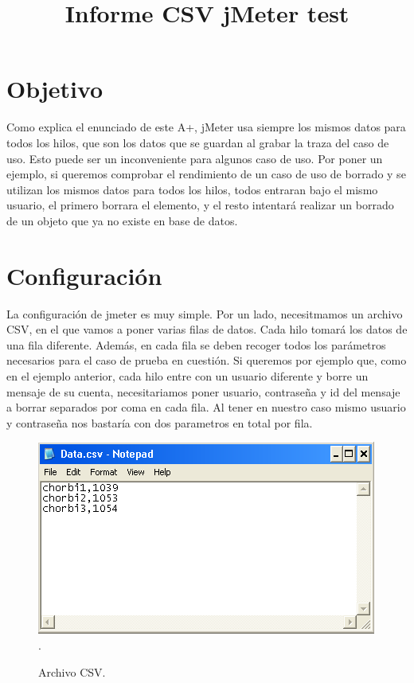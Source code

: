 \documentclass[a4paper]{article}
\title{Informe CSV jMeter test}
\date{}
\begin{document}
\setlength{\voffset}{-1in}
\setlength{\textheight}{680px}
\setlength{\headsep}{30px}
\maketitle

\section{Objetivo}

Como explica el enunciado de este A+, jMeter usa siempre los mismos datos para todos los hilos, que son los datos que se guardan al grabar la traza del caso de uso. Esto puede ser un inconveniente para algunos caso de uso. Por poner un ejemplo, si queremos comprobar el rendimiento de un caso de uso de borrado y se utilizan los mismos datos para todos los hilos, todos entraran bajo el mismo usuario, el primero borrara el elemento, y el resto intentará realizar un borrado de un objeto que ya no existe en base de datos.

\section{Configuración}

La configuración de jmeter es muy simple. Por un lado, necesitmamos un archivo CSV, en el que vamos a poner varias filas de datos. Cada hilo tomará los datos de una fila diferente. Además, en cada fila se deben recoger todos los parámetros necesarios para el caso de prueba en cuestión. Si queremos por ejemplo que, como en el ejemplo anterior, cada hilo entre con un usuario diferente y borre un mensaje de su cuenta, necesitariamos poner usuario, contraseña y id del mensaje a borrar separados por coma en cada fila. Al tener en nuestro caso mismo usuario y contraseña nos bastaría con dos parametros en total por fila. 

\begin{figure}[h!]
\includegraphics[width=\linewidth]{Data}.
  \caption{Archivo CSV.}

\end{figure}
\end{document}
